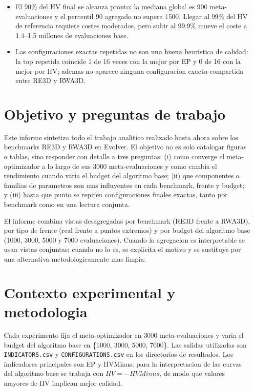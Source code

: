 \documentclass[11pt,a4paper]{article}
\begin{document}
\begin{itemize}
\item El 90\% del HV final se alcanza pronto: la mediana global es 900 meta-evaluaciones y el percentil 90 agregado no supera 1500. Llegar al 99\% del HV de referencia requiere costes moderados, pero subir al 99.9\% mueve el coste a 1.4--1.5 millones de evaluaciones base.

\item Las configuraciones exactas repetidas no son una buena heuristica de calidad: la top repetida coincide 1 de 16 veces con la mejor por EP y 0 de 16 con la mejor por HV; ademas no aparece ninguna configuracion exacta compartida entre RE3D y RWA3D.

\end{itemize}

\clearpage

\tableofcontents

\clearpage


\section{Objetivo y preguntas de trabajo}

Este informe sintetiza todo el trabajo analitico realizado hasta ahora sobre los benchmarks RE3D y RWA3D en Evolver. El objetivo no es solo catalogar figuras o tablas, sino responder con detalle a tres preguntas: (i) como converge el meta-optimizador a lo largo de sus 3000 meta-evaluaciones y como cambia el rendimiento cuando varia el budget del algoritmo base; (ii) que componentes o familias de parametros son mas influyentes en cada benchmark, frente y budget; y (iii) hasta que punto se repiten configuraciones finales exactas, tanto por benchmark como en una lectura conjunta.

El informe combina vistas desagregadas por benchmark (RE3D frente a RWA3D), por tipo de frente (real frente a puntos extremos) y por budget del algoritmo base (1000, 3000, 5000 y 7000 evaluaciones). Cuando la agregacion es interpretable se usan vistas conjuntas; cuando no lo es, se explicita el motivo y se sustituye por una alternativa metodologicamente mas limpia.

\section{Contexto experimental y metodologia}

Cada experimento fija el meta-optimizador en 3000 meta-evaluaciones y varia el budget del algoritmo base en \{1000, 3000, 5000, 7000\}. Las salidas utilizadas son \texttt{INDICATORS.csv} y \texttt{CONFIGURATIONS.csv} en los directorios de resultados. Los indicadores principales son EP y HVMinus; para la interpretacion de las curvas del algoritmo base se trabaja con \(HV = -HVMinus\), de modo que valores mayores de HV implican mejor calidad.
\end{document}
